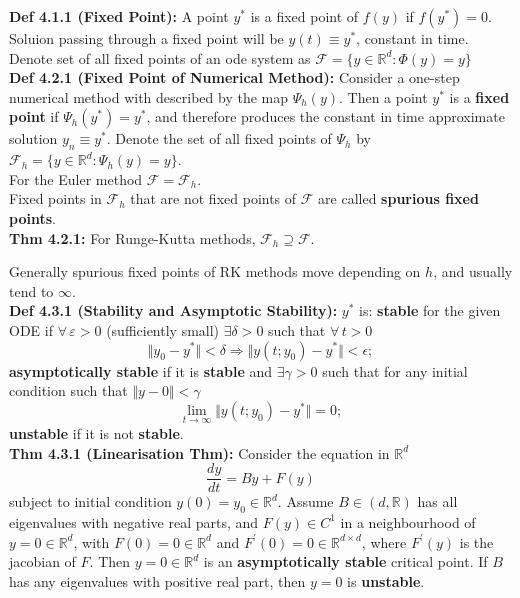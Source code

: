 \documentclass[10pt,a4paper]{article}
\newcommand{\R}{\mathbb{R}}
\newcommand{\F}{\mathcal{F}}
\renewcommand{\implies}{\Rightarrow}
\newcommand{\Mat}{$\text{Mat}$}
\begin{document}
\begin{multicols*}{2}
\textbf{Def 4.1.1 (Fixed Point):} A point $y^*$ is a fixed point of $f(y)$ if $f(y^*) = 0$. Soluion passing through a fixed point will be $y(t) \equiv y^*$, constant in time. Denote set of all fixed points of an ode system as $\F = \{y \in \R^d : \Phi(y) = y\}$\\

\textbf{Def 4.2.1 (Fixed Point of Numerical Method):} Consider a one-step numerical method with described by the map $\Psi_h(y)$. Then a point $y^*$ is a \textbf{fixed point} if $\Psi_h(y^*) = y^*$, and therefore produces the constant in time approximate solution $y_n \equiv y^*$. Denote the set of all fixed points of $\Psi_h$ by $\F_h = \{y \in \R^d : \Psi_h(y) = y\}$.\\

For the Euler method $\F = \F_h$.\\

Fixed points in $\F_h$ that are not fixed points of $\F$ are called \textbf{spurious fixed points}.\\

\textbf{Thm 4.2.1:} For Runge-Kutta methods, $\F_h \supseteq \F$.

Generally spurious fixed points of RK methods move depending on $h$, and usually tend to $\infty$.\\

\textbf{Def 4.3.1 (Stability and Asymptotic Stability):} $y^*$ is:
\textbf{stable} for the given ODE if $\forall \, \varepsilon > 0$ (sufficiently small) $\exists \delta > 0$ such that $\forall \, t > 0$
\[
    \Vert y_0 - y^*\Vert  < \delta \implies \Vert y(t; y_0) - y^* \Vert < \epsilon;
\]
\textbf{asymptotically stable} if it is \textbf{stable} and $\exists \gamma > 0 $ such that for any initial condition such that $\Vert y-0 \Vert < \gamma$ 
\[
    \lim_{t \to \infty} \Vert y(t; y_0) - y^* \Vert = 0;
\]
\textbf{unstable} if it is not \textbf{stable}.\\

\textbf{Thm 4.3.1 (Linearisation Thm):} Consider the equation in $\R^d$ 
\[
\frac{dy}{dt} = By + F(y)
\]
subject to initial condition $y(0) = y_0 \in \R^d$. Assume $B \in \Mat(d, \R)$ has all eigenvalues with negative real parts, and $F(y) \in C^1$ in a neighbourhood of $y = 0 \in \R^d$, with $F(0) = 0 \in \R^d$ and $F^\prime(0) = 0 \in \R^{d \times d}$, where $F^\prime(y)$ is the jacobian of $F$. Then $y = 0 \in \R^d$ is an \textbf{asymptotically stable} critical point. If $B$ has any eigenvalues with positive real part, then $y = 0$ is \textbf{unstable}.\\


\end{multicols*}
\end{document}
